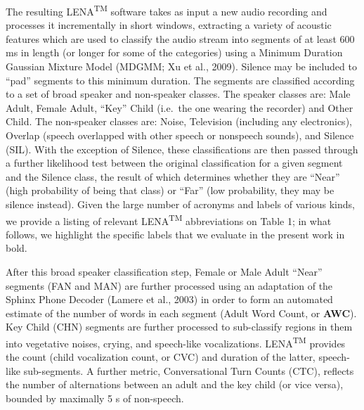 \documentclass[english,floatsintext,man]{apa6}
\begin{document}
The resulting LENA\textsuperscript{TM} software takes as input a new
audio recording and processes it incrementally in short windows,
extracting a variety of acoustic features which are used to classify the
audio stream into segments of at least 600 ms in length (or longer for
some of the categories) using a Minimum Duration Gaussian Mixture Model
(MDGMM; Xu et al., 2009). Silence may be included to \enquote{pad}
segments to this minimum duration. The segments are classified according
to a set of broad speaker and non-speaker classes. The speaker classes
are: Male Adult, Female Adult, \enquote{Key} Child (i.e.~the one wearing
the recorder) and Other Child. The non-speaker classes are: Noise,
Television (including any electronics), Overlap (speech overlapped with
other speech or nonspeech sounds), and Silence (SIL). With the exception
of Silence, these classifications are then passed through a further
likelihood test between the original classification for a given segment
and the Silence class, the result of which determines whether they are
\enquote{Near} (high probability of being that class) or \enquote{Far}
(low probability, they may be silence instead). Given the large number
of acronyms and labels of various kinds, we provide a listing of
relevant LENA\textsuperscript{TM} abbreviations on Table 1; in what
follows, we highlight the specific labels that we evaluate in the
present work in bold.

After this broad speaker classification step, Female or Male Adult
\enquote{Near} segments (FAN and MAN) are further processed using an
adaptation of the Sphinx Phone Decoder (Lamere et al., 2003) in order to
form an automated estimate of the number of words in each segment (Adult
Word Count, or \textbf{AWC}). Key Child (CHN) segments are further
processed to sub-classify regions in them into vegetative noises,
crying, and speech-like vocalizations. LENA\textsuperscript{TM} provides
the count (child vocalization count, or CVC) and duration of the latter,
speech-like sub-segments. A further metric, Conversational Turn Counts
(CTC), reflects the number of alternations between an adult and the key
child (or vice versa), bounded by maximally 5 s of non-speech.
\end{document}
